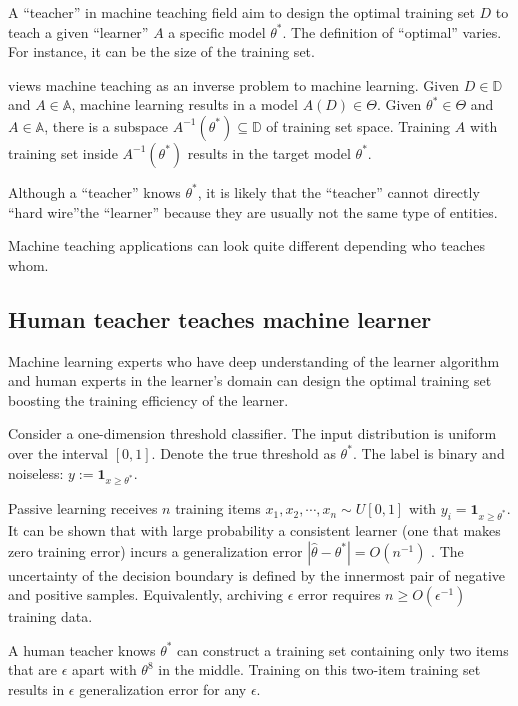    A ``teacher'' in machine teaching field aim to design the optimal training set $D$
    to teach a given ``learner'' $A$ a specific model $\theta^*$.
    The definition of ``optimal'' varies.
    For instance, it can be the size of the training set.

    \cite{Zhu2018} views machine teaching as an inverse problem to machine learning.
    Given $D \in \mathbb{D}$ and $A \in \mathbb{A}$, machine learning results in a model $A(D) \in \Theta$.
    Given $\theta^* \in \Theta$ and $A \in \mathbb{A}$,
    there is a subspace $A^{-1}(\theta^*) \subseteq \mathbb{D}$ of training set space. 
    Training $A$ with training set inside $A^{-1}(\theta^*)$ results in the target model $\theta^*$.

    Although a ``teacher'' knows $\theta^*$,
    it is likely that the ``teacher'' cannot directly ``hard wire''the ``learner''
    because they are usually not the same type of entities.

    Machine teaching applications can look quite different depending who teaches whom.

    \subsection{Human teacher teaches machine learner}

        Machine learning experts who have deep understanding of the learner algorithm
        and human experts in the learner's domain can design the optimal training set
        boosting the training efficiency of the learner.

        Consider a one-dimension threshold classifier.
        The input distribution is uniform over the interval $[0,1]$.
        Denote the true threshold as $\theta^*$.
        The label is binary and noiseless: $y := \bm{1}_{x \geq \theta^*}$.

        Passive learning receives $n$ training items
        $x_1, x_2, \cdots, x_n \sim U[0,1]$ with $y_i = \bm{1}_{x \geq \theta^*}$.
        It can be shown that with large probability a consistent learner (one that makes zero training error)
        incurs a generalization error $\left|\hat{\theta} - \theta^*\right| = O(n^{-1})$ \cite{Zhu2018}.
        The uncertainty of the decision boundary is defined by the innermost pair of negative and positive samples.
        Equivalently, archiving $\epsilon$ error requires $n \geq O(\epsilon^{-1})$ training data.

        A human teacher knows $\theta^*$ can construct a training set containing only two items
        that are $\epsilon$ apart with $\theta^8$ in the middle.
        Training on this two-item training set results in $\epsilon$ generalization error for any $\epsilon$.

